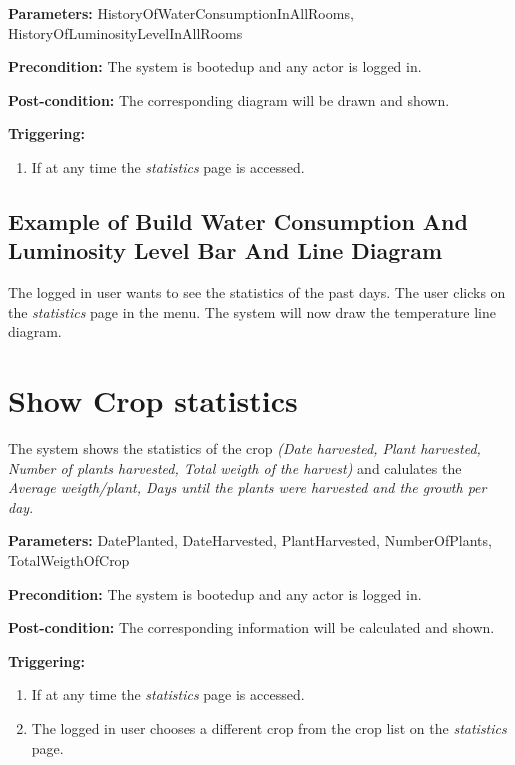\begin{description}

\item \textbf{Parameters:} HistoryOfWaterConsumptionInAllRooms,
HistoryOfLuminosityLevelInAllRooms
\item \textbf{Precondition:} The system is bootedup and any actor is logged in.
\item \textbf{Post-condition:} The corresponding diagram will be drawn and
shown.

\item \textbf{Triggering:}
\begin{enumerate}
\item If at any time the \emph{statistics} page is accessed.
\end{enumerate}
\end{description}

\subsection{Example of Build Water Consumption And Luminosity Level Bar And Line
Diagram}
The logged in user wants to see the statistics of the past days.
The user clicks on the \emph{statistics} page in the menu.
The system will now draw the temperature line diagram.




\section{Show Crop statistics}
\label{operation:ShowCropStatistics}
The system shows the statistics of the crop \emph{(Date harvested, Plant
harvested, Number of plants harvested, Total weigth of the harvest)} and
calulates the \emph{Average weigth/plant, Days until the plants were harvested
and the growth per day}.

\begin{description}

\item \textbf{Parameters:} DatePlanted, DateHarvested, PlantHarvested,
NumberOfPlants, TotalWeigthOfCrop
\item \textbf{Precondition:} The system is bootedup and any actor is logged in.
\item \textbf{Post-condition:} The corresponding information will be calculated
and shown.

\item \textbf{Triggering:}
\begin{enumerate}
\item If at any time the \emph{statistics} page is accessed.
\item The logged in user chooses a different crop from the crop list on the
\emph{statistics} page.
\end{enumerate}
\end{description}

